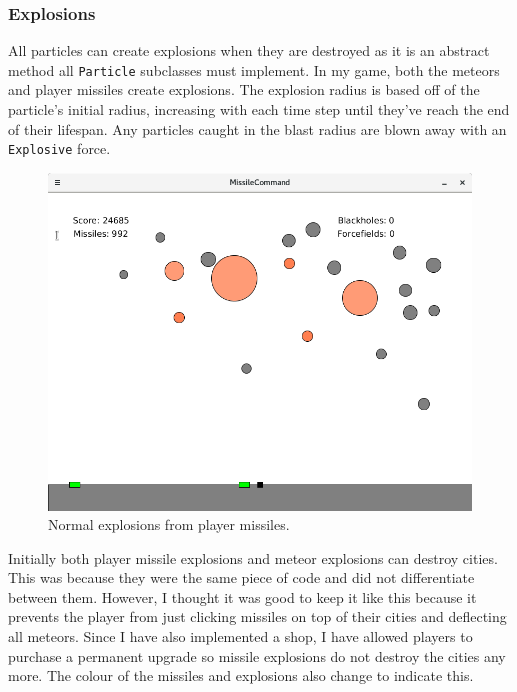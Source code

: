 \documentclass{article}
\begin{document}
\subsubsection*{Explosions}
All particles can create explosions when they are destroyed as it is an abstract method all \texttt{Particle} subclasses must implement. In my game, both the meteors and player missiles create explosions. The explosion radius is based off of the particle's initial radius, increasing with each time step until they've reach the end of their lifespan. Any particles caught in the blast radius are blown away with an \texttt{Explosive} force. 
\begin{figure}[H]
\centering
\includegraphics[width=1\textwidth, keepaspectratio]{imgs/NormalExplosion.png}
\caption{Normal explosions from player missiles.}
\end{figure}
\noindent
Initially both player missile explosions and meteor explosions can destroy cities. This was because they were the same piece of code and did not differentiate between them. However, I thought it was good to keep it like this because it prevents the player from just clicking missiles on top of their cities and deflecting all meteors. Since I have also implemented a shop, I have allowed players to purchase a permanent upgrade so missile explosions do not destroy the cities any more. The colour of the missiles and explosions also change to indicate this. 
\end{document}
